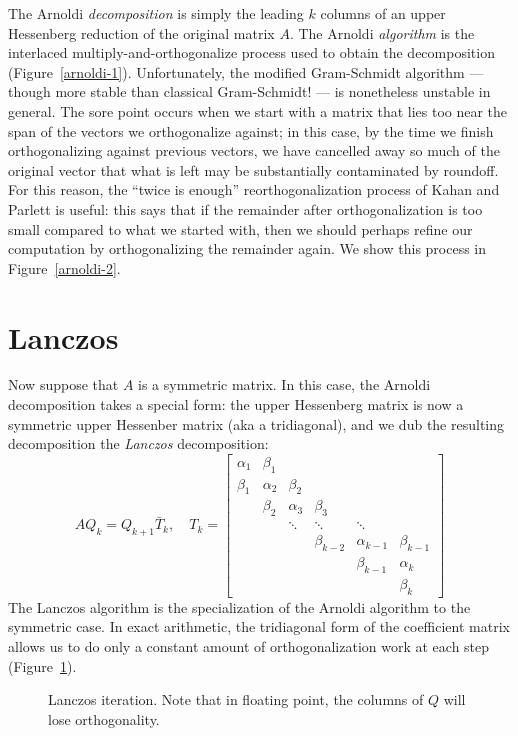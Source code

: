 \documentclass[12pt, leqno]{article} %
\begin{document}
The Arnoldi {\em decomposition} is simply the leading $k$ columns of an
upper Hessenberg reduction of the original matrix $A$.  The Arnoldi
{\em algorithm} is the interlaced multiply-and-orthogonalize process
used to obtain the decomposition (Figure~\ref{arnoldi-1}).
Unfortunately, the modified Gram-Schmidt algorithm --- though more
stable than classical Gram-Schmidt! --- is nonetheless unstable in
general.  The sore point occurs when we start with a matrix that lies
too near the span of the vectors we orthogonalize against; in this case,
by the time we finish orthogonalizing against previous vectors, we have
cancelled away so much of the original vector that what is left may be
substantially contaminated by roundoff.  For this reason, the
``twice is enough'' reorthogonalization process of Kahan and Parlett
is useful: this says that if the remainder after orthogonalization is
too small compared to what we started with, then we should perhaps
refine our computation by orthogonalizing the remainder again.
We show this process in Figure~\ref{arnoldi-2}.

\section{Lanczos}

Now suppose that $A$ is a symmetric matrix.  In this case, the Arnoldi
decomposition takes a special form: the upper Hessenberg matrix is now
a symmetric upper Hessenber matrix (aka a tridiagonal), and we dub
the resulting decomposition the {\em Lanczos} decomposition:
\[
  AQ_k = Q_{k+1} \bar{T}_k, \quad
  T_k =
  \begin{bmatrix}
    \alpha_1 & \beta_1 \\
    \beta_1 & \alpha_2 & \beta_2 \\
            & \beta_2 & \alpha_3 & \beta_3 \\
            & & \ddots & \ddots & \ddots \\
            & & & \beta_{k-2} & \alpha_{k-1} & \beta_{k-1} \\
            & & & & \beta_{k-1} & \alpha_k \\
            & & & & & \beta_k
  \end{bmatrix}
\]
The Lanczos algorithm is the specialization of the Arnoldi algorithm
to the symmetric case.  In exact arithmetic, the tridiagonal form of
the coefficient matrix allows us to do only a constant amount of
orthogonalization work at each step (Figure~\ref{lanczos}).

\begin{figure}

\caption{Lanczos iteration.  Note that in floating point, the columns
  of $Q$ will lose orthogonality.}
\label{lanczos}
\end{figure}
\end{document}
